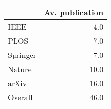 \begin{tabular}{lr}
\toprule
{} &  Av. publication \\
\midrule
IEEE     &              4.0 \\
PLOS     &              7.0 \\
Springer &              7.0 \\
Nature   &             10.0 \\
arXiv    &             16.0 \\
Overall  &             46.0 \\
\bottomrule
\end{tabular}
